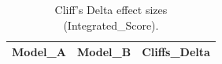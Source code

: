 \begin{table}[t]
\centering
\begin{tabular}{lll}
\toprule
Model_A & Model_B & Cliffs_Delta \\
\midrule
\bottomrule
\end{tabular}
\caption{Cliff's Delta effect sizes (Integrated_Score).}
\label{tab:cliffs_Integrated_Score}
\end{table}